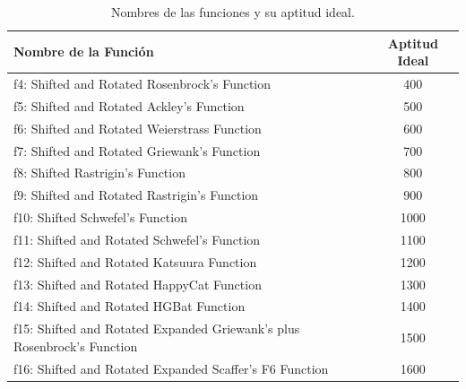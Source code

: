 \documentclass[conference]{IEEEtran}
\begin{document}
\renewcommand{\tablename}{Tabla}
\begin{table}[h]
    \centering
    \begin{tabularx}{0.5\textwidth}{|X|c|}
        \hline
        \textbf{Nombre de la Función}
         & \textbf{Aptitud Ideal} \\
        \hline
        f4: Shifted and Rotated Rosenbrock’s Function
         & 400                    \\
        f5: Shifted and Rotated Ackley’s Function
         & 500                    \\
        f6: Shifted and Rotated Weierstrass Function
         & 600                    \\
        f7: Shifted and Rotated Griewank’s Function
         & 700                    \\
        f8: Shifted Rastrigin’s Function
         & 800                    \\
        f9: Shifted and Rotated Rastrigin’s Function
         & 900                    \\
        f10: Shifted Schwefel’s Function
         & 1000                   \\
        f11: Shifted and Rotated Schwefel’s Function
         & 1100                   \\
        f12: Shifted and Rotated Katsuura Function
         & 1200                   \\
        f13: Shifted and Rotated HappyCat Function
         & 1300                   \\
        f14: Shifted and Rotated HGBat Function
         & 1400                   \\
        f15: Shifted and Rotated Expanded Griewank’s plus Rosenbrock’s Function
         & 1500                   \\
        f16: Shifted and Rotated Expanded Scaffer’s F6 Function
         & 1600                   \\
        \hline
    \end{tabularx}
    \caption{Nombres de las funciones y su aptitud ideal.}
    \label{table:functions}
\end{table}
\end{document}
